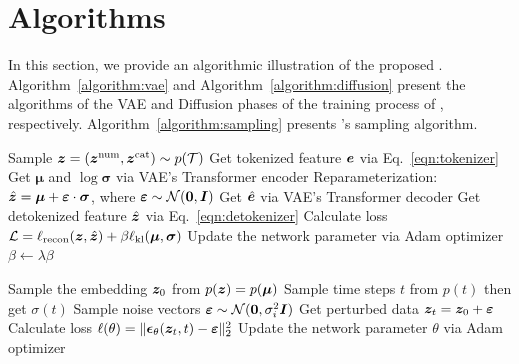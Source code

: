 \newpage
\appendix

\section{Algorithms}\label{appendix:algorithm}
In this section, we provide an algorithmic illustration of the proposed \modelname. Algorithm~\ref{algorithm:vae} and Algorithm~\ref{algorithm:diffusion} present the algorithms of the VAE and Diffusion phases of the training process of \modelname, respectively. Algorithm~\ref{algorithm:sampling} presents \modelname's sampling algorithm.

\begin{minipage}[t]{0.48\textwidth}
\vspace{0pt}
\begin{algorithm}[H]
    \centering
    \caption{\modelname: Training of VAE}\label{algorithm:vae}
    \begin{algorithmic}[1]
        \STATE Sample $ {\bm{z}} = ({\bm{z}}^{{\rm num}}, {\bm{z}}^{{\rm cat}}) \sim p({\mathcal{T}})$
        \STATE Get tokenized feature ${\bm{e}}$ via Eq.~\ref{eqn:tokenizer}
        \STATE Get $\bm{\mu}$ and $\log\bm{\sigma}$ via VAE's Transformer encoder
        \STATE Reparameterization: $\hat{{\bm{z}}} = \bm{\mu} + \bm{\varepsilon} \cdot \bm{\sigma}$, where $\bm{\varepsilon} \sim {\mathcal{N}}(\bm{0}, {\bm{I}})$ 
        \STATE Get $\hat{{\bm{e}}}$ via VAE's Transformer decoder
        \STATE Get detokenized feature $\hat{{\bm{z}}}$ via Eq.~\ref{eqn:detokenizer}
        \STATE Calculate loss ${\mathcal{L}} = \ell_{\rm recon}({\bm{z}}, \hat{{\bm{z}}}) + \beta \ell_{\rm kl} (\bm{\mu}, \bm{\sigma}) $
        \STATE Update the network parameter via Adam optimizer
        \STATE $\beta \leftarrow \lambda\beta$ 
        \ENDIF
    \end{algorithmic}
\end{algorithm}
\end{minipage}
\hfill
\begin{minipage}[t]{0.48\textwidth}
\begin{algorithm}[H]
    \centering
    \caption{\modelname: Training of Diffusion}\label{algorithm:diffusion}
    \begin{algorithmic}[1]
         \STATE Sample the embedding ${\bm{z}}_0$ from $p({\bm{z}}) = p(\bm{\mu})$
        \STATE Sample time steps $t$ from $p(t)$ then get $\sigma (t)$
        \STATE Sample noise vectors ${\bm{\varepsilon}} \sim {\mathcal{N}}(\bm{0}, \sigma_i^2 {\bm{I}})$
        \STATE Get perturbed data ${{\bm{z}}}_{t} = {\bm{z}}_0 + {\bm{\varepsilon}}$
        \STATE Calculate loss $\ell(\theta) =  \| \bm{\epsilon}_{\theta}({\bm{z}}_t, t)-\bm{\varepsilon}\|_2^2$
        \STATE Update the network parameter $\theta$ via Adam optimizer
    \end{algorithmic}
\end{algorithm}
\end{minipage}

